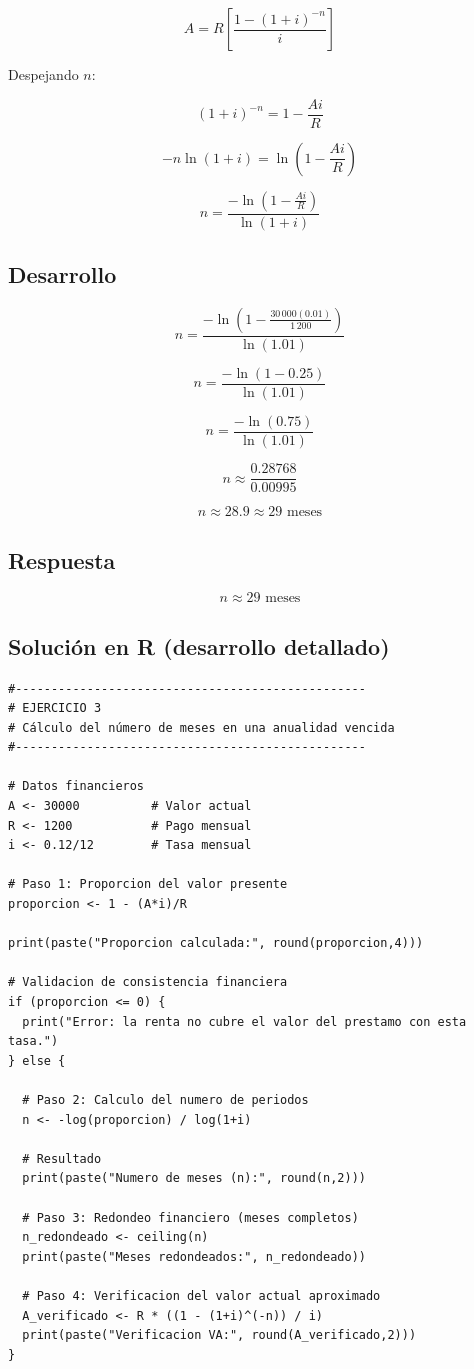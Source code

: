 \documentclass[12pt]{article}
\begin{document}
\[
A = R\left[\frac{1-(1+i)^{-n}}{i}\right]
\]

Despejando \(n\):

\[
(1+i)^{-n} = 1 - \frac{Ai}{R}
\]

\[
-n \ln(1+i) = \ln\left(1 - \frac{Ai}{R}\right)
\]

\[
n = \frac{-\ln\left(1 - \frac{Ai}{R}\right)}{\ln(1+i)}
\]

\subsection*{Desarrollo}

\[
n = \frac{-\ln\left(1 - \frac{30\,000(0.01)}{1\,200}\right)}{\ln(1.01)}
\]

\[
n = \frac{-\ln(1 - 0.25)}{\ln(1.01)}
\]

\[
n = \frac{-\ln(0.75)}{\ln(1.01)}
\]

\[
n \approx \frac{0.28768}{0.00995}
\]

\[
n \approx 28.9 \approx 29 \text{ meses}
\]

\subsection*{Respuesta}

\[
\boxed{n \approx 29 \text{ meses}}
\]

\subsection*{Solución en R (desarrollo detallado)}

\begin{lstlisting}
#-------------------------------------------------
# EJERCICIO 3
# Cálculo del número de meses en una anualidad vencida
#-------------------------------------------------

# Datos financieros
A <- 30000          # Valor actual
R <- 1200           # Pago mensual
i <- 0.12/12        # Tasa mensual

# Paso 1: Proporcion del valor presente
proporcion <- 1 - (A*i)/R

print(paste("Proporcion calculada:", round(proporcion,4)))

# Validacion de consistencia financiera
if (proporcion <= 0) {
  print("Error: la renta no cubre el valor del prestamo con esta tasa.")
} else {

  # Paso 2: Calculo del numero de periodos
  n <- -log(proporcion) / log(1+i)

  # Resultado
  print(paste("Numero de meses (n):", round(n,2)))

  # Paso 3: Redondeo financiero (meses completos)
  n_redondeado <- ceiling(n)
  print(paste("Meses redondeados:", n_redondeado))

  # Paso 4: Verificacion del valor actual aproximado
  A_verificado <- R * ((1 - (1+i)^(-n)) / i)
  print(paste("Verificacion VA:", round(A_verificado,2)))
}
\end{lstlisting}
\end{document}
